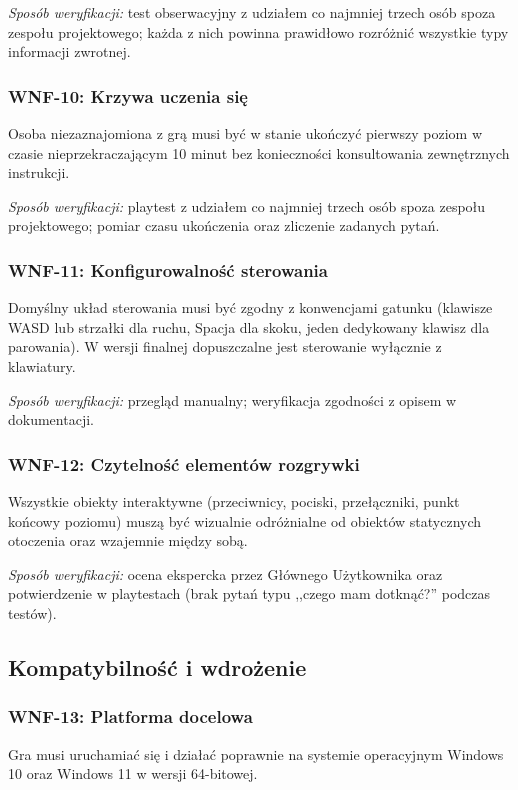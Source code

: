 \textit{Sposób weryfikacji:} test obserwacyjny z udziałem co najmniej trzech osób spoza zespołu projektowego; każda z nich powinna prawidłowo rozróżnić wszystkie typy informacji zwrotnej.

\subsubsection*{WNF-10: Krzywa uczenia się}
Osoba niezaznajomiona z grą musi być w stanie ukończyć pierwszy poziom w czasie nieprzekraczającym 10 minut bez konieczności konsultowania zewnętrznych instrukcji.

\textit{Sposób weryfikacji:} playtest z udziałem co najmniej trzech osób spoza zespołu projektowego; pomiar czasu ukończenia oraz zliczenie zadanych pytań.

\subsubsection*{WNF-11: Konfigurowalność sterowania}
Domyślny układ sterowania musi być zgodny z konwencjami gatunku (klawisze WASD lub strzałki dla ruchu, Spacja dla skoku, jeden dedykowany klawisz dla parowania). W wersji finalnej dopuszczalne jest sterowanie wyłącznie z klawiatury.

\textit{Sposób weryfikacji:} przegląd manualny; weryfikacja zgodności z opisem w dokumentacji.

\subsubsection*{WNF-12: Czytelność elementów rozgrywki}
Wszystkie obiekty interaktywne (przeciwnicy, pociski, przełączniki, punkt końcowy poziomu) muszą być wizualnie odróżnialne od obiektów statycznych otoczenia oraz wzajemnie między sobą.

\textit{Sposób weryfikacji:} ocena ekspercka przez Głównego Użytkownika oraz potwierdzenie w playtestach (brak pytań typu ,,czego mam dotknąć?'' podczas testów).

\subsection{Kompatybilność i wdrożenie}

\subsubsection*{WNF-13: Platforma docelowa}
Gra musi uruchamiać się i działać poprawnie na systemie operacyjnym Windows 10 oraz Windows 11 w wersji 64-bitowej.

